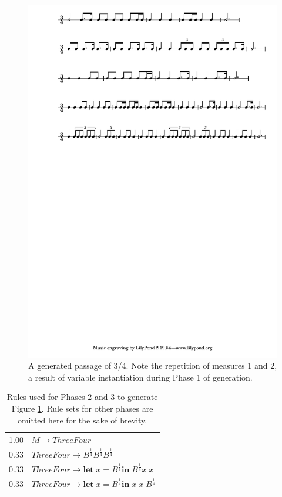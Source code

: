 \documentclass{article}
\begin{document}
\begin{figure}[t] %
\centering
\includegraphics[width=16cm]{3_4_new.pdf}
\caption{A generated passage of 3/4. Note the repetition of measures 1 and 2, a result of variable instantiation during Phase 1 of generation.}\label{example_3_4}
\end{figure}

\begin{table}
\centering
\begin{tabular}{ll}
1.00 & $M \rightarrow ThreeFour$\\
0.33 & $ThreeFour \rightarrow B^\frac{1}{4} B^\frac{1}{4} B^\frac{1}{4}$\\
0.33 & $ThreeFour \rightarrow \textbf{let} \; x = B^\frac{1}{4} \textbf{in} \; B^\frac{1}{4} x \; x$\\
0.33 & $ThreeFour \rightarrow \textbf{let} \; x = B^\frac{1}{4} \textbf{in} \; x \; x \; B^\frac{1}{4}$\\
\end{tabular}
\caption{Rules used for Phases 2 and 3 to generate Figure \ref{example_3_4}. Rule sets for other phases are omitted here for the sake of brevity.}\label{3_4rules_phases23}
\end{table}
\end{document}
